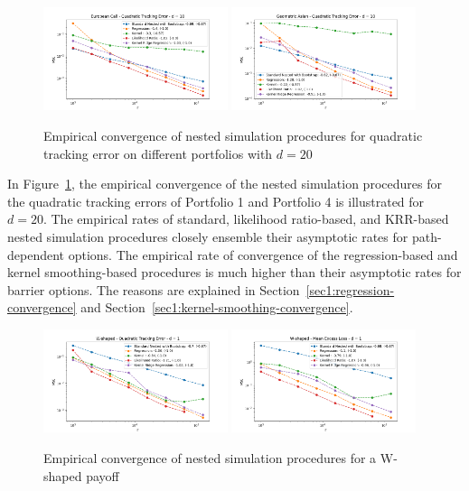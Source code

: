 \begin{figure}[ht!] 
    \centering
    \includegraphics[width=0.48\textwidth]{./project1/figures/figure6a.png}
    \includegraphics[width=0.48\textwidth]{./project1/figures/figure6b.png}
    \caption{Empirical convergence of nested simulation procedures for quadratic tracking error on different portfolios with $d=20$}
    \label{fig1:1x03} 
\end{figure}

In Figure~\ref{fig1:1x03}, the empirical convergence of the nested simulation procedures for the quadratic tracking errors of Portfolio 1 and Portfolio 4 is illustrated for $d = 20$.
The empirical rates of standard, likelihood ratio-based, and KRR-based nested simulation procedures closely ensemble their asymptotic rates for path-dependent options.
The empirical rate of convergence of the regression-based and kernel smoothing-based procedures is much higher than their asymptotic rates for barrier options. 
The reasons are explained in Section~\ref{sec1:regression-convergence} and Section~\ref{sec1:kernel-smoothing-convergence}.

\begin{figure}[ht!] 
    \centering
    \includegraphics[width=0.48\textwidth]{./project1/figures/figure7a.png}
    \includegraphics[width=0.48\textwidth]{./project1/figures/figure7b.png}
    \caption{Empirical convergence of nested simulation procedures for a W-shaped payoff}
    \label{fig1:5503} 
\end{figure}


